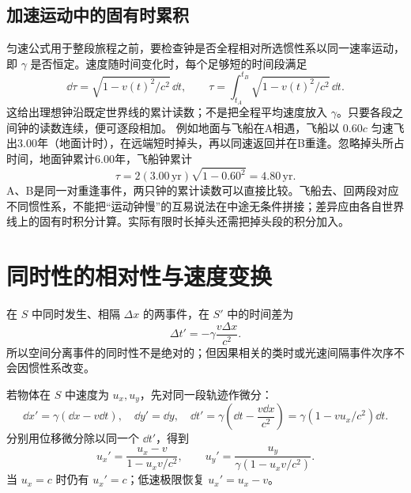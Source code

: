 \subsection{加速运动中的固有时累积}
匀速公式用于整段旅程之前，要检查钟是否全程相对所选惯性系以同一速率运动，即 $\gamma$ 是否恒定。速度随时间变化时，每个足够短的时间段满足
\[
 \dd\tau=\sqrt{1-v(t)^2/c^2}\,\dd t,\qquad
 \tau=\int_{t_A}^{t_B}\sqrt{1-v(t)^2/c^2}\,\dd t.
\]
这给出理想钟沿既定世界线的累计读数；不是把全程平均速度放入 $\gamma$。只要各段之间钟的读数连续，便可逐段相加。
例如地面与飞船在A相遇，飞船以 $0.60c$ 匀速飞出3.00年（地面计时），在远端短时掉头，再以同速返回并在B重逢。忽略掉头所占时间，地面钟累计6.00年，飞船钟累计
\[
 \tau=2(3.00\,\mathrm{yr})\sqrt{1-0.60^2}=4.80\,\mathrm{yr}.
\]
A、B是同一对重逢事件，两只钟的累计读数可以直接比较。飞船去、回两段对应不同惯性系，不能把“运动钟慢”的互易说法在中途无条件拼接；差异应由各自世界线上的固有时积分计算。实际有限时长掉头还需把掉头段的积分加入。

\section{同时性的相对性与速度变换}

在 $S$ 中同时发生、相隔 $\Delta x$ 的两事件，在 $S'$ 中的时间差为
\begin{equation}
 \Delta t'=-\gamma\frac{v\Delta x}{c^2}.
\end{equation}
所以空间分离事件的同时性不是绝对的；但因果相关的类时或光速间隔事件次序不会因惯性系改变。

若物体在 $S$ 中速度为 $u_x,u_y$，先对同一段轨迹作微分：
\[
 \dd x'=\gamma(\dd x-v\dd t),\quad
 \dd y'=\dd y,\quad
 \dd t'=\gamma\left(\dd t-\frac{v\dd x}{c^2}\right)
 =\gamma(1-vu_x/c^2)\dd t.
\]
分别用位移微分除以同一个 $\dd t'$，得到
\begin{equation}
 u_x'=\frac{u_x-v}{1-u_xv/c^2},\qquad
 u_y'=\frac{u_y}{\gamma(1-u_xv/c^2)}.
\end{equation}
当 $u_x=c$ 时仍有 $u_x'=c$；低速极限恢复 $u_x'=u_x-v$。


